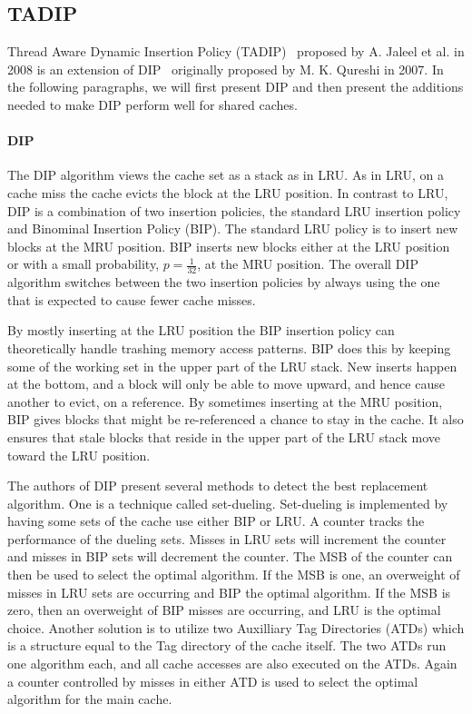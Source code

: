 \subsection{TADIP}
\label{sec:background:algorithms:tadip}

Thread Aware Dynamic Insertion Policy (TADIP)~\cite{Jaleel2008} proposed by A. Jaleel et al. in 2008 is an extension of DIP~\cite{Qureshi2007} originally proposed by M. K. Qureshi in 2007.
In the following paragraphs, we will first present DIP and then present the additions needed to make DIP perform well for shared caches.

\paragraph{DIP}

The DIP algorithm views the cache set as a stack as in LRU.
As in LRU, on a cache miss the cache evicts the block at the LRU position. 
In contrast to LRU, DIP is a combination of two insertion policies, the standard LRU insertion policy and Binominal Insertion Policy (BIP).
The standard LRU policy is to insert new blocks at the MRU position.
BIP inserts new blocks either at the LRU position or with a small probability, $p = \frac{1}{32}$, at the MRU position. The overall DIP algorithm switches between the two insertion policies by always using the one that is expected to cause fewer cache misses.

By mostly inserting at the LRU position the BIP insertion policy can theoretically handle trashing memory access patterns.
BIP does this by keeping some of the working set in the upper part of the LRU stack. 
New inserts happen at the bottom, and a block will only be able to move upward, and hence cause another to evict, on a reference.
By sometimes inserting at the MRU position, BIP gives blocks that might be re-referenced a chance to stay in the cache.
It also ensures that stale blocks that reside in the upper part of the LRU stack move toward the LRU position.

The authors of DIP present several methods to detect the best replacement algorithm. 
One is a technique called set-dueling.
Set-dueling is implemented by having some sets of the cache use either BIP or LRU. 
A counter tracks the performance of the dueling sets.
Misses in LRU sets will increment the counter and misses in BIP sets will decrement the counter.
The MSB of the counter can then be used to select the optimal algorithm.
If the MSB is one, an overweight of misses in LRU sets are occurring and BIP the optimal algorithm. 
If the MSB is zero, then an overweight of BIP misses are occurring, and LRU is the optimal choice.
Another solution is to utilize two Auxilliary Tag Directories (ATDs) which is a structure equal to the Tag directory of the cache itself.
The two ATDs run one algorithm each, and all cache accesses are also executed on the ATDs.
Again a counter controlled by misses in either ATD is used to select the optimal algorithm for the main cache.

